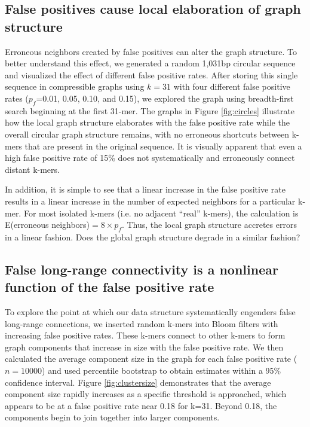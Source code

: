 \documentclass[draft]{pnastwo}
\begin{document}
\begin{article}
\subsection{False positives cause local elaboration of graph structure}

Erroneous neighbors created by false positives can alter the graph
structure.  To better understand this effect, we generated a random
1,031bp circular sequence and visualized the effect of different false
positive rates.  After storing this single sequence in compressible
graphs using $k=31$ with four different false positive rates
($p_f$=0.01, 0.05, 0.10, and 0.15), we explored the graph using
breadth-first search beginning at the first 31-mer.  The graphs in
Figure \ref{fig:circles} illustrate how the local graph structure
elaborates with the false positive rate while the overall circular
graph structure remains, with no erroneous shortcuts between k-mers
that are present in the original sequence.  It is visually apparent
that even a high false positive rate of 15\% does not systematically
and erroneously connect distant k-mers.

In addition, it is simple to see that a linear increase in the false
positive rate results in a linear increase in the number of expected
neighbors for a particular k-mer. For most isolated k-mers (i.e. no
adjacent ``real'' k-mers), the calculation is E(erroneous neighbors)$
= 8 \times p_f$. Thus, the local graph structure accretes errors in a
linear fashion.  Does the global graph structure degrade in a similar
fashion?

\subsection{False long-range connectivity is a nonlinear function of the false positive rate}

To explore the point at which our data structure systematically
engenders false long-range connections, we inserted random k-mers into
Bloom filters with increasing false positive rates.  These k-mers
connect to other k-mers to form graph components that increase in size
with the false positive rate.  We then calculated the average
component size in the graph for each false positive rate ($n=10000$)
and used percentile bootstrap to obtain estimates within a 95\%
confidence interval. Figure \ref{fig:clustersize} demonstrates that
the average component size rapidly increases as a specific threshold
is approached, which appears to be at a false positive rate near 0.18
for k=31. Beyond 0.18, the components begin to join together into
larger components.


\end{article}
\end{document}

